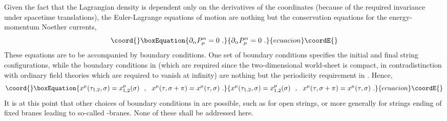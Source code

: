 \documentclass[a4paper,11pt]{article}
\begin{document}
Given the fact that the Lagrangian density is dependent only on the
\myHighlight{$\xi^\alpha$}\coordHE{} derivatives of the coordinates \coordHE{} (because of
the required invariance under spacetime translations), the Euler-Lagrange
equations of motion are nothing but the conservation equations for the
energy-momentum Noether currents,
\begin{equation}\coord{}\boxEquation{
\partial_\alpha P^\alpha_\mu=0\ .
}{
\partial_\alpha P^\alpha_\mu=0\ .
}{ecuacion}\coordE{}\end{equation}
These equations are to be accompanied by boundary conditions. One set of
boundary conditions specifies the initial and final string configurations,
while the boundary conditions in \myHighlight{$\sigma$}\coordHE{} (which are required since the
two-dimensional world-sheet is compact, in contradistinction with
ordinary field theories which are required to vanish at infinity) are
nothing but the periodicity requirement in \myHighlight{$\sigma\rightarrow \sigma+\pi$}\coordHE{}.
Hence,
\begin{equation}\coord{}\boxEquation{
x^\mu(\tau_{1,2},\sigma)=x^\mu_{1,2}(\sigma)\ \ ,\ \ 
x^\mu(\tau,\sigma+\pi)=x^\mu(\tau,\sigma)\ .
}{
x^\mu(\tau_{1,2},\sigma)=x^\mu_{1,2}(\sigma)\ \ ,\ \ 
x^\mu(\tau,\sigma+\pi)=x^\mu(\tau,\sigma)\ .
}{ecuacion}\coordE{}\end{equation}
It is at this point that other choices of boundary conditions in \myHighlight{$\sigma$}\coordHE{}
are possible, such as for open strings, or more generally for strings
ending of fixed branes leading to so-called \myHighlight{$Dp$}\coordHE{}-branes.\cite{Pol} 
None of these shall be addressed here.
\end{document}
